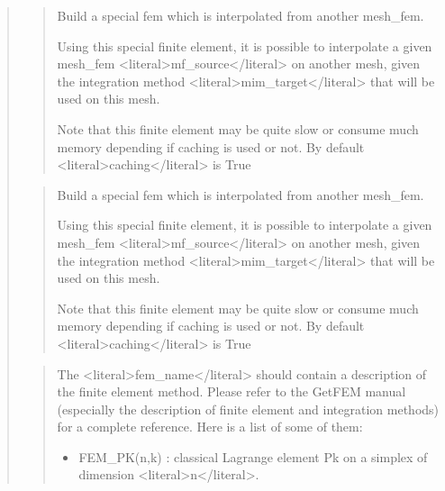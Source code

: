 \documentclass[a4paper,11pt,english]{sphinxmanual}
\begin{document}
\sphinxAtStartPar
{}
\begin{quote}

\sphinxAtStartPar
{}
\begin{quote}

\sphinxAtStartPar
Build a special fem which is interpolated from another mesh\_fem.

\sphinxAtStartPar
Using this special finite element, it is possible to interpolate a given
mesh\_fem \textless{}literal\textgreater{}mf\_source\textless{}/literal\textgreater{} on another mesh, given the integration method \textless{}literal\textgreater{}mim\_target\textless{}/literal\textgreater{}
that will be used on this mesh.

\sphinxAtStartPar
Note that this finite element may be quite slow or consume much
memory depending if caching is used or not. By default \textless{}literal\textgreater{}caching\textless{}/literal\textgreater{} is
True
\end{quote}

\sphinxAtStartPar
{}
\begin{quote}

\sphinxAtStartPar
Build a special fem which is interpolated from another mesh\_fem.

\sphinxAtStartPar
Using this special finite element, it is possible to interpolate a given
mesh\_fem \textless{}literal\textgreater{}mf\_source\textless{}/literal\textgreater{} on another mesh, given the integration method \textless{}literal\textgreater{}mim\_target\textless{}/literal\textgreater{}
that will be used on this mesh.

\sphinxAtStartPar
Note that this finite element may be quite slow or consume much
memory depending if caching is used or not. By default \textless{}literal\textgreater{}caching\textless{}/literal\textgreater{} is
True
\end{quote}

\sphinxAtStartPar
{}
\begin{quote}

\sphinxAtStartPar
The \textless{}literal\textgreater{}fem\_name\textless{}/literal\textgreater{} should contain a description of the finite element
method. Please refer to the GetFEM manual (especially the
description of finite element and integration methods) for a complete
reference. Here is a list of some of them:
\begin{itemize}
\item {} 
\sphinxAtStartPar
FEM\_PK(n,k) :
classical Lagrange element Pk on a simplex of dimension \textless{}literal\textgreater{}n\textless{}/literal\textgreater{}.


\end{itemize}
\end{quote}
\end{quote}
\end{document}

